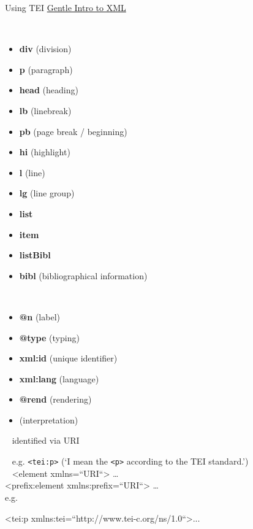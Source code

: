 \begin{frame}{Using TEI}
\footnotesize
\href{http://www.tei-c.org/release/doc/tei-p5-doc/en/html/SG.html}{Gentle Intro to XML}

\begin{multicols}{2}
~ 
\begin{itemize}
    \item \textbf{div} (division) \item \textbf{p} (paragraph) \item \textbf{head} (heading) \item \textbf{lb} (linebreak) \item \textbf{pb} (page break / beginning) \item \textbf{hi} (highlight) \item \textbf{l} (line) \item \textbf{lg} (line group) \item \textbf{list} \item \textbf{item} \item \textbf{listBibl} \item \textbf{bibl} (bibliographical information)
\end{itemize}

~ 
\begin{itemize}
    \item \textbf{@n} (label) \item \textbf{@type} (typing) \item \textbf{xml:id} (unique identifier) \item \textbf{xml:lang} (language) \item \textbf{@rend} (rendering) \item {} (interpretation)
\end{itemize}
\end{multicols}


\framebreak

~ identified via URI 

~
e.g. \texttt{<tei:p>} (`I mean the \texttt{<p>} according to the TEI standard.') \\

~ <element xmlns=“URI“> \dots \\
<prefix:element xmlns:prefix=“URI“> \dots \\
e.g. 
\begin{xmlcode}
<tei:p xmlns:tei=“http://www.tei-c.org/ns/1.0“>...
\end{xmlcode}


\end{frame}
